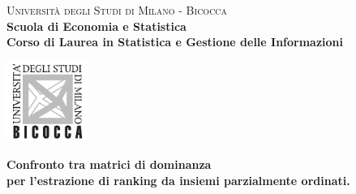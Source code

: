 \begin{titlepage}
        
        \centering
        
        \begin{minipage}[t]{1\textwidth}
        	\centering
        {
                {\LARGE\textsc{Università degli Studi di Milano - Bicocca}} \\
                \Large\textbf{Scuola di Economia e Statistica} \\
                \textbf{Corso di Laurea in Statistica e Gestione delle Informazioni} \\
                \par
        }
        \end{minipage}
        
        \centering
        \begin{minipage}[t]{\textwidth}
        	\vspace{10mm}
        \end{minipage}
         
        \centering
        \begin{minipage}[t]{1\textwidth}
       	\centering
        \includegraphics[width=0.2\textwidth]{IMAGES/logo_unimib.pdf}
        \end{minipage}
        
        \begin{minipage}[t]{\textwidth}
        \end{minipage}
        
		\vspace{1mm}
        
		\begin{center}
			\Huge{
				\textbf{Confronto tra matrici di dominanza \\ 
				per l’estrazione di ranking da insiemi parzialmente ordinati.\\}
				}
		\end{center}
        
        \vspace{40mm}


\end{titlepage}
